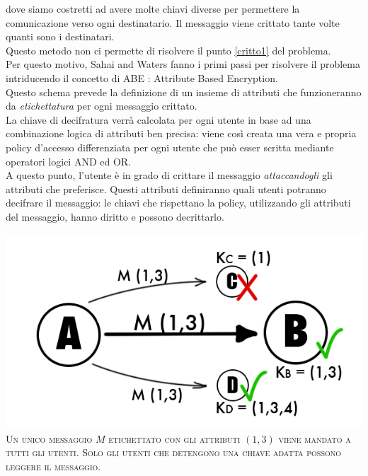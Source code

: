 dove siamo costretti ad avere molte chiavi diverse per permettere la comunicazione verso ogni destinatario. Il messaggio viene crittato tante volte quanti sono i destinatari.\\
Questo metodo non ci permette di risolvere il punto \ref{critto1} del problema.\\[0.3cm]

Per questo motivo, Sahai and Waters \cite{sahai} fanno i primi passi per risolvere il problema intriducendo il concetto di ABE : Attribute Based Encryption.\\
Questo schema prevede la definizione di un insieme di attributi che funzioneranno da \emph{etichettatura} per ogni messaggio crittato.\\
La chiave di decifratura verrà calcolata per ogni utente in base ad una combinazione logica di attributi ben precisa: viene così creata una vera e propria policy d'accesso differenziata per ogni utente che può esser scritta mediante operatori logici AND ed OR.\\[0.4cm]
A questo punto, l'utente è in grado di crittare il messaggio \emph{attaccandogli} gli attributi che preferisce. Questi attributi definiranno quali utenti potranno decifrare il messaggio: le chiavi che rispettano la policy, utilizzando gli attributi del messaggio, hanno diritto e possono decrittarlo.\\[0.2cm]

\begin{center}
\begin{minipage}[c]{0.9\textwidth}
		\centering
		\includegraphics[keepaspectratio,width=\textwidth]{pairing.png}\\
		{\small\scshape Un unico messaggio $M$ etichettato con gli attributi $(1,3)$ viene mandato a tutti gli utenti. Solo gli utenti che detengono una chiave adatta possono leggere il messaggio.}
\end{minipage}
\end{center}

